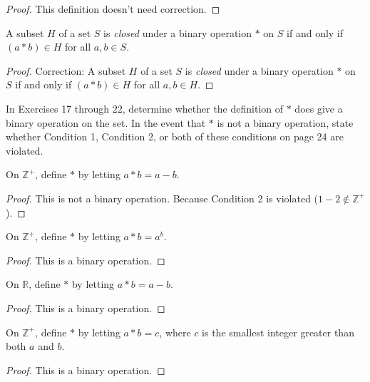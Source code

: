 \begin{proof}
    This definition doesn't need correction.
\end{proof}

\begin{exercise}
    A subset $H$ of a set $S$ is \textit{closed} under a binary operation $*$ on $S$ if and only if $(a * b)\in H$ for all $a, b\in S$.
\end{exercise}

\begin{proof}
    Correction: A subset $H$ of a set $S$ is \textit{closed} under a binary operation $*$ on $S$ if and only if $(a * b)\in H$ for all $a, b\in H$.
\end{proof}

In Exercises 17 through 22, determine whether the definition of $*$ does give a binary operation on the set. In the event that $*$ is not a binary operation, state whether Condition 1, Condition 2, or both of these conditions on page 24 are violated.

\begin{exercise}
    On $\mathbb{Z}^{+}$, define $*$ by letting $a * b = a - b$.
\end{exercise}

\begin{proof}
    This is not a binary operation. Because Condition 2 is violated ($1 - 2\notin\mathbb{Z}^{+}$).
\end{proof}

\begin{exercise}
    On $\mathbb{Z}^{+}$, define $*$ by letting $a * b = a^{b}$.
\end{exercise}

\begin{proof}
    This is a binary operation.
\end{proof}

\begin{exercise}
    On $\mathbb{R}$, define $*$ by letting $a * b = a - b$.
\end{exercise}

\begin{proof}
    This is a binary operation.
\end{proof}

\begin{exercise}
    On $\mathbb{Z}^{+}$, define $*$ by letting $a * b = c$, where $c$ is the smallest integer greater than both $a$ and $b$.
\end{exercise}

\begin{proof}
    This is a binary operation.
\end{proof}

